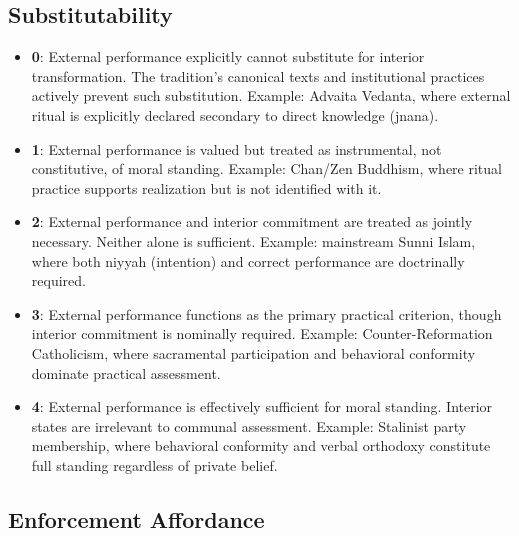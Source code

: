 \documentclass[12pt]{article}
\begin{document}
\subsection{Substitutability}

\begin{itemize}
\item \textbf{0}: External performance explicitly cannot substitute for interior transformation. The tradition's canonical texts and institutional practices actively prevent such substitution. Example: Advaita Vedanta, where external ritual is explicitly declared secondary to direct knowledge (jnana).
\item \textbf{1}: External performance is valued but treated as instrumental, not constitutive, of moral standing. Example: Chan/Zen Buddhism, where ritual practice supports realization but is not identified with it.
\item \textbf{2}: External performance and interior commitment are treated as jointly necessary. Neither alone is sufficient. Example: mainstream Sunni Islam, where both niyyah (intention) and correct performance are doctrinally required.
\item \textbf{3}: External performance functions as the primary practical criterion, though interior commitment is nominally required. Example: Counter-Reformation Catholicism, where sacramental participation and behavioral conformity dominate practical assessment.
\item \textbf{4}: External performance is effectively sufficient for moral standing. Interior states are irrelevant to communal assessment. Example: Stalinist party membership, where behavioral conformity and verbal orthodoxy constitute full standing regardless of private belief.
\end{itemize}

\subsection{Enforcement Affordance}
\end{document}
